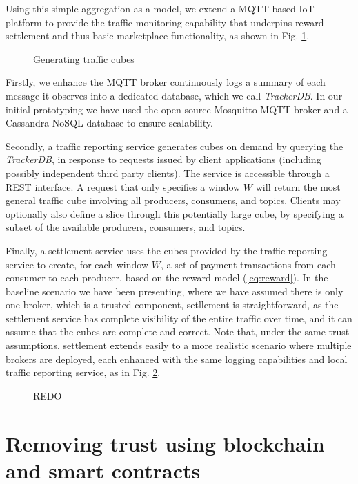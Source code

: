 \documentclass[conference]{IEEEtran}
\begin{document}
Using this simple aggregation as a model, we extend a  MQTT-based IoT platform to provide the traffic monitoring capability that underpins reward settlement and thus basic marketplace functionality, as shown in Fig. \ref{fig:cubes}.

\begin{figure}
	\caption{Generating traffic cubes}
	\label{fig:cubes}
\end{figure}

Firstly, we enhance the MQTT broker continuously logs a summary of each message it observes into a dedicated database, which we call \textit{TrackerDB}.  In our initial prototyping we have used the open source Mosquitto MQTT broker and a Cassandra NoSQL database to ensure scalability. 

Secondly, a traffic reporting service generates cubes on demand by querying the \textit{TrackerDB}, in response to requests issued by client applications (including possibly independent third party clients). The service is accessible through a REST interface. A request that only specifies a window $ W $ will return the most general traffic cube involving all producers, consumers, and topics. Clients may optionally also define a slice through this potentially large cube, by specifying a subset of the available producers, consumers, and topics.

Finally, a settlement service uses the cubes provided by the traffic reporting service to create, for each window $ W $, a set of payment transactions from each consumer to each producer, based on the reward model (\ref{eq:reward}).
In the baseline scenario we have been presenting, where we have assumed there is only one broker, which is a trusted component, setllement is straightforward, as the settlement service has complete visibility of the entire traffic over time, and it can assume that the cubes are complete and correct.
Note that, under the same trust assumptions, settlement extends easily to a more realistic scenario where multiple brokers are deployed, each enhanced with the same logging capabilities and local traffic reporting service, as in Fig. \ref{fig:cubes-in-context}.

\begin{figure}
	\caption{REDO}
	\label{fig:cubes-in-context}
\end{figure}

\section{Removing trust using blockchain and smart contracts}
\end{document}
